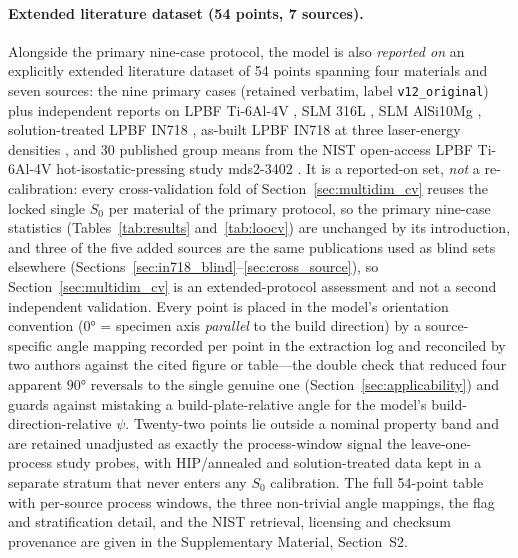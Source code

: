 \documentclass[12pt,a4paper,twocolumn]{article}
\begin{document}
\paragraph{Extended literature dataset (54 points, 7 sources).}
Alongside the primary nine-case protocol, the model is also \emph{reported on} an explicitly extended literature dataset of 54 points spanning four materials and seven sources: the nine primary cases (retained verbatim, label \texttt{v12\_original}) plus independent reports on LPBF Ti-6Al-4V \cite{sun2024ti64adem}, SLM 316L \cite{hitzler2017materials}, SLM AlSi10Mg \cite{metals2018alsi_aniso}, solution-treated LPBF IN718 \cite{hovig2018in718}, as-built LPBF IN718 at three laser-energy densities \cite{watring2020addma}, and 30 published group means from the NIST open-access LPBF Ti-6Al-4V hot-isostatic-pressing study mds2-3402 \cite{nisthip_ti64,nistir8551}. It is a reported-on set, \emph{not} a re-calibration: every cross-validation fold of Section~\ref{sec:multidim_cv} reuses the locked single $S_0$ per material of the primary protocol, so the primary nine-case statistics (Tables~\ref{tab:results} and~\ref{tab:loocv}) are unchanged by its introduction, and three of the five added sources are the same publications used as blind sets elsewhere (Sections~\ref{sec:in718_blind}--\ref{sec:cross_source}), so Section~\ref{sec:multidim_cv} is an extended-protocol assessment and not a second independent validation. Every point is placed in the model's orientation convention ($\ang{0}$ = specimen axis \emph{parallel} to the build direction) by a source-specific angle mapping recorded per point in the extraction log and reconciled by two authors against the cited figure or table---the double check that reduced four apparent $\ang{90}$ reversals to the single genuine one (Section~\ref{sec:applicability}) and guards against mistaking a build-plate-relative angle for the model's build-direction-relative $\psi$. Twenty-two points lie outside a nominal property band and are retained unadjusted as exactly the process-window signal the leave-one-process study probes, with HIP/annealed and solution-treated data kept in a separate stratum that never enters any $S_0$ calibration. The full 54-point table with per-source process windows, the three non-trivial angle mappings, the flag and stratification detail, and the NIST retrieval, licensing and checksum provenance are given in the Supplementary Material, Section~S2.

\end{document}
